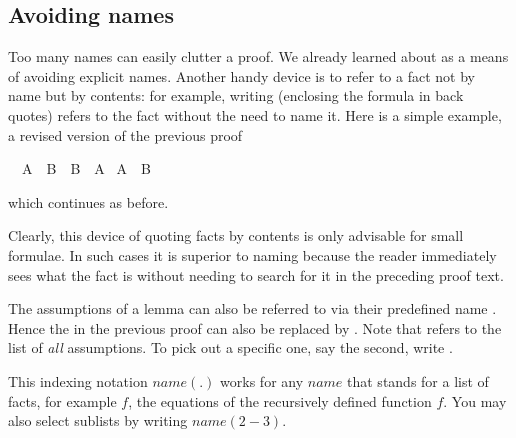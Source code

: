\begin{isabellebody}
\begin{isamarkuptext}
\subsection{Avoiding names}

Too many names can easily clutter a proof.  We already learned
about  as a means of avoiding explicit names. Another
handy device is to refer to a fact not by name but by contents: for
example, writing  (enclosing the formula in back quotes)
refers to the fact 
without the need to name it. Here is a simple example, a revised version
of the previous proof%
\end{isamarkuptext}%
\isamarkuptrue%
\isamarkupfalse%
\ \ {\isachardoublequoteopen}A\ {\isasymor}\ B{\isachardoublequoteclose}\ \ {\isachardoublequoteopen}B\ {\isasymor}\ A{\isachardoublequoteclose}\isanewline
%
\isadelimproof
%
\endisadelimproof
%
\isatagproof
{}\isamarkupfalse%
\ {\isacharbackquoteopen}A\ {\isasymor}\ B{\isacharbackquoteclose}%
\endisatagproof
{\isafoldproof}%
%
\isadelimproof
%
\endisadelimproof
%
\begin{isamarkuptext}%
\noindent which continues as before.

Clearly, this device of quoting facts by contents is only advisable
for small formulae. In such cases it is superior to naming because the
reader immediately sees what the fact is without needing to search for
it in the preceding proof text.

The assumptions of a lemma can also be referred to via their
predefined name . Hence the  in the
previous proof can also be replaced by . Note that  refers to the list of \emph{all} assumptions. To pick out a
specific one, say the second, write .

This indexing notation $name(.)$ works for any $name$ that stands for
a list of facts, for example $f$, the equations of the
recursively defined function $f$. You may also select sublists by writing
$name(2-3)$.


\end{isamarkuptext}
\end{isabellebody}
